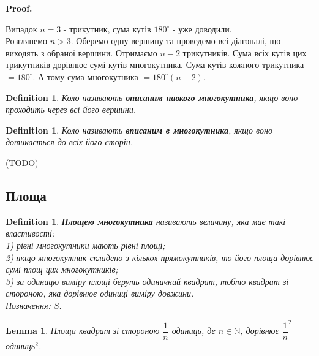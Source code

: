 \documentclass[a4paper, 10pt]{article}
\makeatletter
\def\qed{$\blacksquare$}
\theoremstyle{theoremdd}
\theoremstyle{theoremdd}
\theoremstyle{theoremdd}
\newtheorem{definition}[theorem]{Definition}
\theoremstyle{theoremdd}
\theoremstyle{theoremdd}
\theoremstyle{theoremdd}
\theoremstyle{theoremdd}
\theoremstyle{theoremdd}
\newtheorem{lemma}[theorem]{Lemma}
\theoremstyle{theoremdd}
\renewenvironment{proof}[1][Proof.\\]{\par
\pushQED{\hfill \qed}%
\normalfont \topsep6\p@\@plus6\p@\relax
\trivlist
\item\relax
{\bfseries
#1\@addpunct{.}}\hspace\labelsep\ignorespaces
}{%
\popQED\endtrivlist\@endpefalse
}
\makeatother
\begin{document}
\begin{proof}
Випадок $n=3$ - трикутник, сума кутів $180^\circ$ - уже доводили.\\
Розглянемо $n > 3$. Оберемо одну вершину та проведемо всі діагоналі, що виходять з обраної вершини. Отримаємо $n-2$ трикутників. Сума всіх кутів цих трикутників дорівнює сумі кутів многокутника. Сума кутів кожного трикутника $= 180^\circ$. А тому сума многокутника $= 180^\circ (n-2)$.
\begin{figure}[H]
\centering
{}
\end{figure}
\end{proof}

\begin{definition}
Коло називають \textbf{описаним навкого многокутника}, якщо воно проходить через всі його вершини.
\end{definition}

\begin{definition}
Коло називають \textbf{вписаним в многокутника}, якщо воно дотикається до всіх його сторін.
\end{definition}
(TODO)

\subsection{Площа}
\begin{definition}
\textbf{Площею многокутника} називають величину, яка має такі властивості:\\
1) рівні многокутники мають рівні площі;\\
2) якщо многокутник складено з кількох прямокутників, то його площа дорівнює сумі площ цих многокутників;\\
3) за одиницю виміру площі беруть одиничний квадрат, тобто квадрат зі стороною, яка дорівнює одиниці виміру довжини.\\
Позначення: $S$.
\end{definition}

\begin{lemma}
Площа квадрат зі стороною $\dfrac{1}{n}$ одиниць, де $n \in \mathbb{N}$, дорівнює $\dfrac{1}{n}^2$ одиниць$^2$.
\end{lemma}
\end{document}
